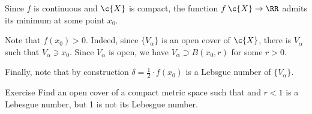 Since $f$ is continuous and $\c{X}$ is compact,
the function $f\:\c{X}\to \RR$ admits its minimum at some point $x_0$.

Note that $f(x_0)>0$.
Indeed, since $\{V_\alpha\}$ is an open cover of $\c{X}$,
there is $V_\alpha$ such that $V_\alpha\ni x_0$.
Since $V_\alpha$ is open, we have $V_\alpha\supset B(x_0,r)$ for some $r>0$.

Finally, note that by construction $\delta=\tfrac12\cdot f(x_0)$ is a Lebsgue number of $\{V_\alpha\}$. 
\qeds

\begin{thm}{Exercise}
Find an open cover of a compact metric space such that and $r<1$ is a Lebesgue number, but 1 is not its Lebesgue number.
\end{thm}
